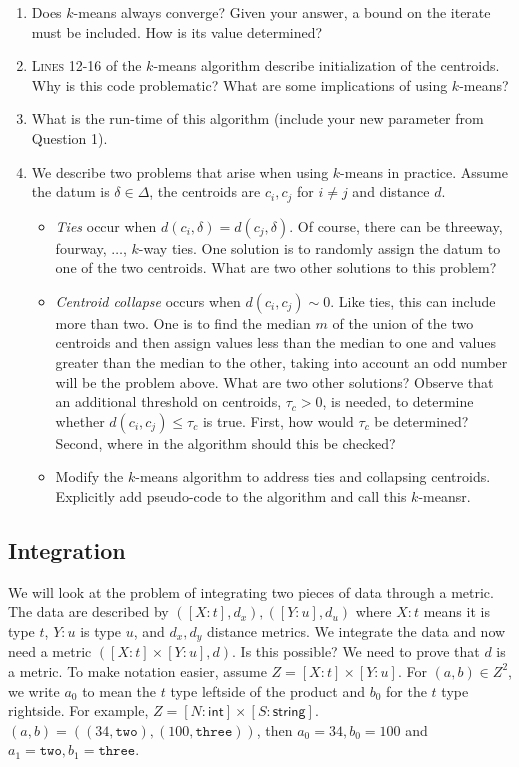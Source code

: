 \documentclass{article}
\begin{document}
\begin{enumerate}
\item Does $k$-means always converge? Given your answer, a bound on the iterate must be included.  How is its value determined?
\item \textsc{Lines} 12-16 of the $k$-means algorithm describe initialization of the centroids.  Why is this code problematic?  What are some implications of using $k$-means?    
\item What is the run-time of this algorithm (include your new parameter from Question 1).
\item We describe two problems that arise when using $k$-means in practice.  Assume the datum is $\delta\in\Delta$, the centroids are $c_i, c_j$ for $i\neq j$ and distance $d$.  
\begin{itemize}
\item {\it Ties} occur when $d(c_i, \delta) = d(c_j, \delta)$.  Of course, there can be threeway, fourway, $\ldots$, $k$-way ties.  One solution is to randomly assign the datum to one of the two centroids.   What are two other solutions to this problem?
\item {\it Centroid collapse} occurs when $d(c_i, c_j) \sim 0$. Like ties, this can include more than two.  One is to find the median $m$ of the union of the two centroids and then assign values less than the median to one and values greater than the median to the other, taking into account an odd number will be the problem above.  What are two other solutions?  Observe that an additional threshold on centroids, $\tau_c > 0$, is needed, to determine whether $d(c_i, c_j) \leq \tau_c$ is true.  First, how would $\tau_c$ be determined?  Second, where in the algorithm should this be checked?
\item Modify the $k$-means algorithm to address ties and collapsing centroids.  Explicitly add pseudo-code to the algorithm and call this $k$-meansr. 
\end{itemize}
\end{enumerate}

\subsection*{Integration}
We will look at the problem of integrating two pieces of data through a metric.  The data are described by $([X:t], d_x), ([Y:u], d_u)$ where $X:t$ means it is type $t$,  $Y:u$ is type $u$, and $d_x,d_y$ distance metrics.  We integrate the data and now need a metric $([X:t]\times [Y:u], d)$.  Is this possible?  We need to prove  that $d$ is a metric.  To make notation easier, assume $Z = [X:t]\times [Y:u]$.  For $(a,b) \in Z^2$, we write $a_0$ to mean the $t$ type leftside of the product and $b_0$ for the $t$ type rightside.  For example, $Z = [N : \textsf{int}] \times [S : \textsf{string}]$.  $(a,b) = ((34, \texttt{two}), (100, \texttt{three}))$, then $a_0 = 34, b_0 = 100$ and $a_1 = \texttt{two}, b_1 = \texttt{three}$.
\end{document}
